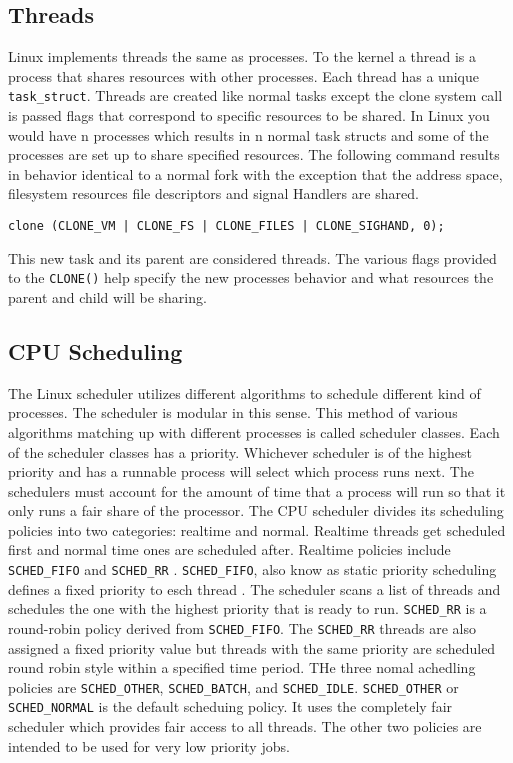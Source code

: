 \subsection{Threads}
\noindent
Linux implements threads the same as processes. To the kernel a thread is a process that shares resources with other processes. Each thread has a unique \lstinline{task_struct}. Threads are created like normal tasks except the clone system call is passed flags that correspond to specific resources to be shared. In Linux you would have n processes which results in n normal task structs and  some of the processes are set up to share specified resources. 
\newline
\newline
\noindent
The following command results in behavior identical to a normal fork with the exception that the address space, filesystem resources file descriptors and signal Handlers are shared. 
\begin{lstlisting}
clone (CLONE_VM | CLONE_FS | CLONE_FILES | CLONE_SIGHAND, 0);
\end{lstlisting}
This new task and its parent are considered threads. The various flags provided to the \lstinline{CLONE()} help specify the new processes behavior and what resources the parent and child will be sharing.\cite{LinuxTextbook}

\subsection{CPU Scheduling}
\noindent
The Linux scheduler utilizes different algorithms to schedule different kind of processes. The scheduler is modular in this sense. This method of various algorithms matching up with different processes is called scheduler classes. Each of the scheduler classes has a priority. Whichever scheduler is of the highest priority and has a runnable process will select which process runs next. The schedulers must account for the amount of time that a process will run so that it only runs a fair share of the processor. 
\newline
\newline
\noindent
The CPU scheduler divides its scheduling policies into two categories: realtime and normal. Realtime threads get scheduled first and normal time ones are scheduled after. Realtime policies include \lstinline{SCHED_FIFO} and \lstinline{SCHED_RR} \cite{red}. \lstinline{SCHED_FIFO}, also know as static priority scheduling defines a fixed priority to esch thread \cite{red}. The scheduler scans a list of threads and schedules the one with the highest priority that is ready to run.  \lstinline{SCHED_RR} is a round-robin policy derived from \lstinline{SCHED_FIFO}. The \lstinline{SCHED_RR} threads are also assigned a fixed priority value but threads with the same priority are scheduled round robin style within a specified time period. THe three nomal achedling policies are \lstinline{SCHED_OTHER}, \lstinline{SCHED_BATCH}, and \lstinline{SCHED_IDLE}. \lstinline{SCHED_OTHER} or \lstinline{SCHED_NORMAL} is the default scheduing policy. It uses the completely fair scheduler which provides fair access to all threads. The other two policies are intended to be used for very low priority jobs.

